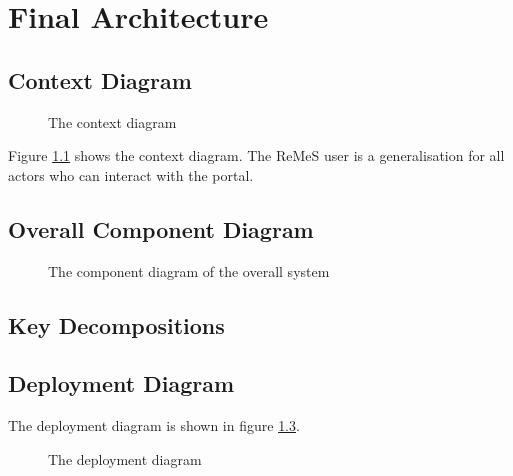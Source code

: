 \chapter{Final Architecture}
\label{chap:final-architecture}

\section{Context Diagram}

\begin{figure}
	\begin{centering}
		\caption{The context diagram}
		\label{fig:final-context}
	\end{centering}
\end{figure}

\npar Figure \ref{fig:final-context} shows the context diagram. The ReMeS
user is a generalisation for all actors who can interact with the portal. 

\section{Overall Component Diagram}

\begin{figure}
	\begin{centering}
		\caption{The component diagram of the overall system}
		\label{fig:final-components}
	\end{centering}
\end{figure}

\section{Key Decompositions}

\section{Deployment Diagram}

\npar The deployment diagram is shown in figure \ref{fig:final-deployment}. 

\begin{figure}
	\begin{centering}
		\caption{The deployment diagram}
		\label{fig:final-deployment}
	\end{centering}
\end{figure}


